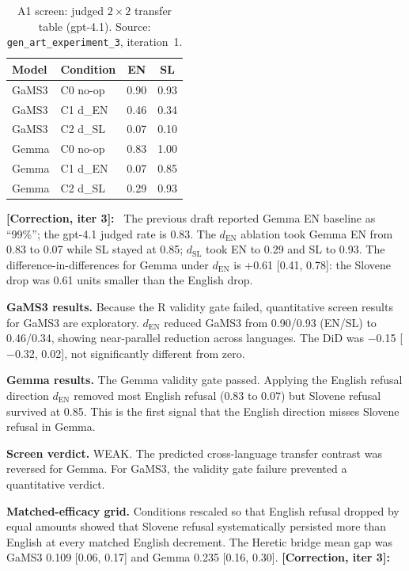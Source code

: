 \documentclass[11pt,letterpaper]{article}
\newcommand{\corr}[1]{\noindent\textbf{[Correction, iter #1]:}~}
\begin{document}
\begin{table}[!htbp]
\centering
\caption{A1 screen: judged $2\times2$ transfer table (gpt-4.1). Source: \texttt{gen\_art\_experiment\_3}, iteration~1.}
\label{tab:iter1_judged_2x2}
\small
\begin{tabular}{llcc}
\toprule
Model & Condition & EN & SL \\
\midrule
GaMS3 & C0 no-op & 0.90 & 0.93 \\
GaMS3 & C1 d\_EN & 0.46 & 0.34 \\
GaMS3 & C2 d\_SL & 0.07 & 0.10 \\
Gemma & C0 no-op & 0.83 & 1.00 \\
Gemma & C1 d\_EN & 0.07 & 0.85 \\
Gemma & C2 d\_SL & 0.29 & 0.93 \\
\bottomrule
\end{tabular}
\end{table}

\corr{3} The previous draft reported Gemma EN baseline as ``99\%''; the gpt-4.1 judged rate is 0.83. The $d_\mathrm{EN}$ ablation took Gemma EN from 0.83 to 0.07 while SL stayed at 0.85; $d_\mathrm{SL}$ took EN to 0.29 and SL to 0.93. The difference-in-differences for Gemma under $d_\mathrm{EN}$ is +0.61 [0.41, 0.78]: the Slovene drop was 0.61 units smaller than the English drop.

\textbf{GaMS3 results.} Because the R validity gate failed, quantitative screen results for GaMS3 are exploratory. $d_\mathrm{EN}$ reduced GaMS3 from 0.90/0.93 (EN/SL) to 0.46/0.34, showing near-parallel reduction across languages. The DiD was $-$0.15 [$-$0.32, 0.02], not significantly different from zero.

\textbf{Gemma results.} The Gemma validity gate passed. Applying the English refusal direction $d_\mathrm{EN}$ removed most English refusal (0.83 to 0.07) but Slovene refusal survived at 0.85. This is the first signal that the English direction misses Slovene refusal in Gemma.

\textbf{Screen verdict.} WEAK. The predicted cross-language transfer contrast was reversed for Gemma. For GaMS3, the validity gate failure prevented a quantitative verdict.

\textbf{Matched-efficacy grid.} Conditions rescaled so that English refusal dropped by equal amounts showed that Slovene refusal systematically persisted more than English at every matched English decrement. The Heretic bridge mean gap was GaMS3 0.109 [0.06, 0.17] and Gemma 0.235 [0.16, 0.30]. \corr{3}
\end{document}
